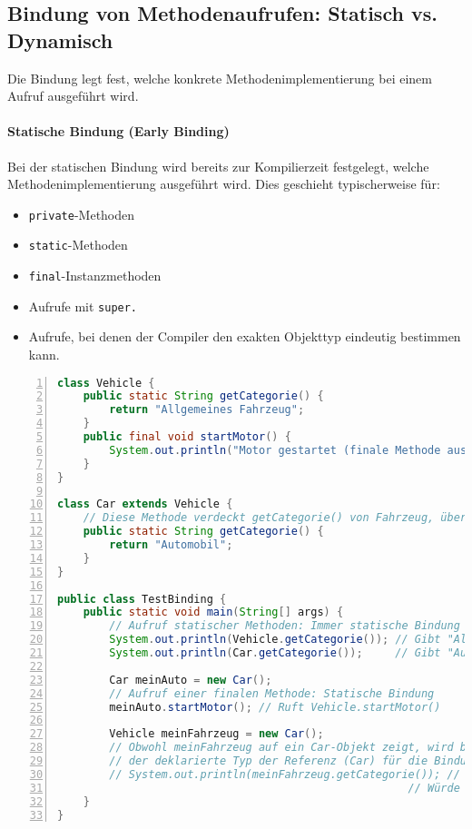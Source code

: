 \subsection{Bindung von Methodenaufrufen: Statisch vs. Dynamisch}
\label{ssec:bindungen}

Die Bindung legt fest, welche konkrete Methodenimplementierung bei einem Aufruf ausgeführt wird.

\paragraph{Statische Bindung (Early Binding)}
Bei der statischen Bindung wird bereits zur Kompilierzeit festgelegt, welche Methodenimplementierung ausgeführt wird. Dies geschieht typischerweise für:
\begin{itemize}
    \item \texttt{private}-Methoden
    \item \texttt{static}-Methoden
    \item \texttt{final}-Instanzmethoden
    \item Aufrufe mit \texttt{super.}
    \item Aufrufe, bei denen der Compiler den exakten Objekttyp eindeutig bestimmen kann.
\end{itemize}

\begin{lstlisting}[language=Java, caption={Beispiele für statische Bindung}, label=lst:statische_bindung, basicstyle=\ttfamily\footnotesize, breaklines=true, frame=tb, numbers=left]
class Vehicle {
    public static String getCategorie() {
        return "Allgemeines Fahrzeug";
    }
    public final void startMotor() {
        System.out.println("Motor gestartet (finale Methode aus Fahrzeug)");
    }
}

class Car extends Vehicle {
    // Diese Methode verdeckt getCategorie() von Fahrzeug, überschreibt sie aber nicht.
    public static String getCategorie() {
        return "Automobil";
    }
}

public class TestBinding {
    public static void main(String[] args) {
        // Aufruf statischer Methoden: Immer statische Bindung
        System.out.println(Vehicle.getCategorie()); // Gibt "Allgemeines Fahrzeug" aus
        System.out.println(Car.getCategorie());     // Gibt "Automobil" aus

        Car meinAuto = new Car();
        // Aufruf einer finalen Methode: Statische Bindung
        meinAuto.startMotor(); // Ruft Vehicle.startMotor()

        Vehicle meinFahrzeug = new Car();
        // Obwohl meinFahrzeug auf ein Car-Objekt zeigt, wird bei statischen Methoden
        // der deklarierte Typ der Referenz (Car) für die Bindung verwendet.
        // System.out.println(meinFahrzeug.getCategorie()); // Schlechter Stil! Sollte Vehicle.getCategorie() sein.
                                                      // Würde "Allgemeines Fahrzeug" ausgeben.
    }
}
\end{lstlisting}

